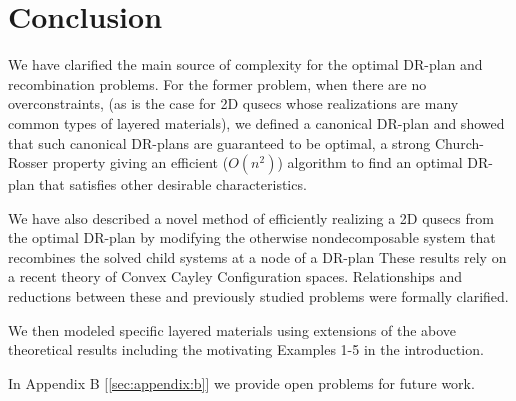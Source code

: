 \section{Conclusion}
% 

We have clarified the main source of complexity for the optimal DR-plan and recombination problems. For the former problem, when there are no overconstraints, (as is the case for 2D qusecs whose realizations are many common types of layered materials), we defined a canonical DR-plan and showed that such canonical DR-plans are guaranteed to be optimal, a strong Church-Rosser property giving an efficient ($O(n^2)$) algorithm to find an optimal  DR-plan that satisfies other desirable characteristics.

We have also described a novel method of efficiently realizing a 2D qusecs from the optimal DR-plan by modifying the otherwise nondecomposable system that recombines the solved child systems at a node of a DR-plan These results rely on a recent theory of Convex Cayley Configuration spaces. Relationships and reductions between these and previously studied problems were formally clarified.

We then modeled specific layered materials using extensions of the above theoretical results including the motivating Examples 1-5 in the introduction.

In Appendix B [\ref{sec:appendix:b}] we provide open problems for future work.
